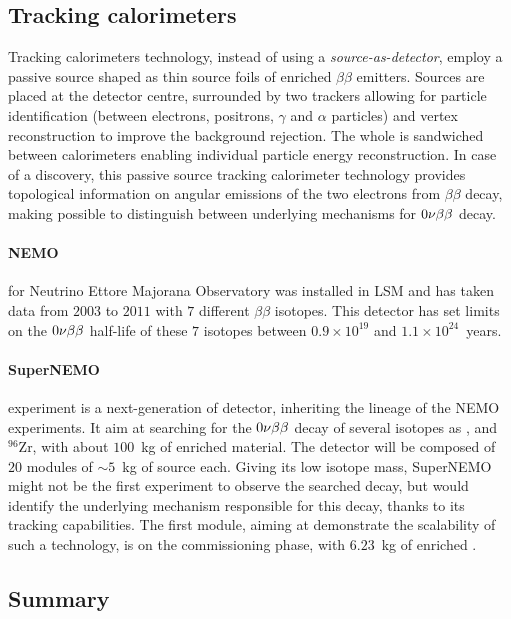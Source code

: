 \subsection{Tracking calorimeters}
\label{subsec:trackocalo}
Tracking calorimeters technology, instead of using a \emph{source-as-detector}, employ a passive source shaped as thin source foils of enriched $\beta\beta$ emitters.
Sources are placed at the detector centre, surrounded by two trackers allowing for particle identification (between electrons, positrons, $\gamma$ and $\alpha$ particles) and vertex reconstruction to improve the background rejection.
The whole is sandwiched between calorimeters enabling individual particle energy reconstruction.
In case of a discovery, this passive source tracking calorimeter technology provides topological information on angular emissions of the two electrons from $\beta\beta$ decay, making possible to distinguish between underlying mechanisms for $0\nu\beta\beta$ decay.

\paragraph{NEMO} for Neutrino Ettore Majorana Observatory was installed in LSM and has taken data from $2003$ to $2011$ with $7$ different $\beta\beta$ isotopes.
This detector has set limits on the $0\nu\beta\beta$ half-life of these $7$ isotopes between $0.9\times 10^{19}$ and $1.1\times 10^{24}$~years.

\paragraph{SuperNEMO} experiment is a next-generation of detector, inheriting the lineage of the NEMO experiments.
It aim at searching for the $0\nu\beta\beta$ decay of several isotopes as \Se, \Nd and $^{96}$Zr, with about $100$~kg of enriched material.
The detector will be composed of $20$ modules of $\sim 5$~kg of source each.
Giving its low isotope mass, SuperNEMO might not be the first experiment to observe the searched decay, but would identify the underlying mechanism responsible for this decay, thanks to its tracking capabilities.
The first module, aiming at demonstrate the scalability of such a technology, is on the commissioning phase, with $6.23$~kg of enriched \Se.

\subsection{Summary}

